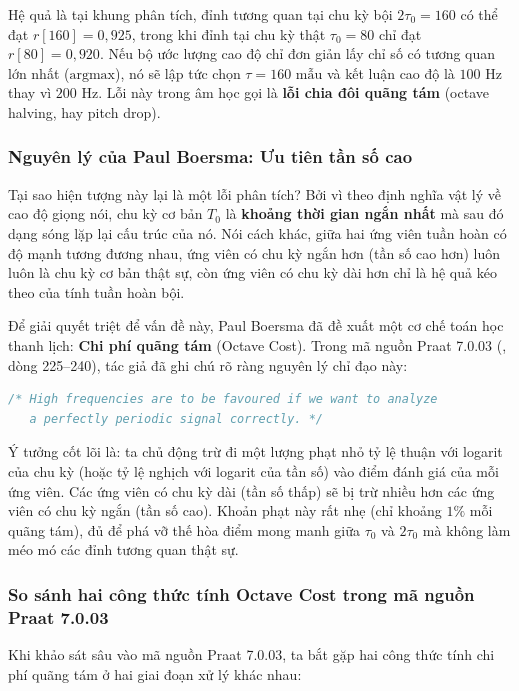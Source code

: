 Hệ quả là tại khung phân tích, đỉnh tương quan tại chu kỳ bội $2\tau_0 = 160$ có thể đạt $r[160] = 0{,}925$, trong khi đỉnh tại chu kỳ thật $\tau_0 = 80$ chỉ đạt $r[80] = 0{,}920$. Nếu bộ ước lượng cao độ chỉ đơn giản lấy chỉ số có tương quan lớn nhất ($\text{argmax}$), nó sẽ lập tức chọn $\tau = 160\text{ mẫu}$ và kết luận cao độ là $100\text{ Hz}$ thay vì $200\text{ Hz}$. Lỗi này trong âm học gọi là \textbf{lỗi chia đôi quãng tám} (octave halving, hay pitch drop).

\subsubsection*{Nguyên lý của Paul Boersma: Ưu tiên tần số cao}
Tại sao hiện tượng này lại là một lỗi phân tích? Bởi vì theo định nghĩa vật lý về cao độ giọng nói, chu kỳ cơ bản $T_0$ là \textbf{khoảng thời gian ngắn nhất} mà sau đó dạng sóng lặp lại cấu trúc của nó. Nói cách khác, giữa hai ứng viên tuần hoàn có độ mạnh tương đương nhau, ứng viên có chu kỳ ngắn hơn (tần số cao hơn) luôn luôn là chu kỳ cơ bản thật sự, còn ứng viên có chu kỳ dài hơn chỉ là hệ quả kéo theo của tính tuần hoàn bội.

Để giải quyết triệt để vấn đề này, Paul Boersma đã đề xuất một cơ chế toán học thanh lịch: \textbf{Chi phí quãng tám} (Octave Cost). Trong mã nguồn Praat 7.0.03 (, dòng 225--240), tác giả đã ghi chú rõ ràng nguyên lý chỉ đạo này:
\begin{lstlisting}[language=C++, numbers=none]
/* High frequencies are to be favoured if we want to analyze
   a perfectly periodic signal correctly. */
\end{lstlisting}

Ý tưởng cốt lõi là: ta chủ động trừ đi một lượng phạt nhỏ tỷ lệ thuận với logarit của chu kỳ (hoặc tỷ lệ nghịch với logarit của tần số) vào điểm đánh giá của mỗi ứng viên. Các ứng viên có chu kỳ dài (tần số thấp) sẽ bị trừ nhiều hơn các ứng viên có chu kỳ ngắn (tần số cao). Khoản phạt này rất nhẹ (chỉ khoảng $1\%$ mỗi quãng tám), đủ để phá vỡ thế hòa điểm mong manh giữa $\tau_0$ và $2\tau_0$ mà không làm méo mó các đỉnh tương quan thật sự.

\subsubsection*{So sánh hai công thức tính Octave Cost trong mã nguồn Praat 7.0.03}
Khi khảo sát sâu vào mã nguồn Praat 7.0.03, ta bắt gặp hai công thức tính chi phí quãng tám ở hai giai đoạn xử lý khác nhau:

